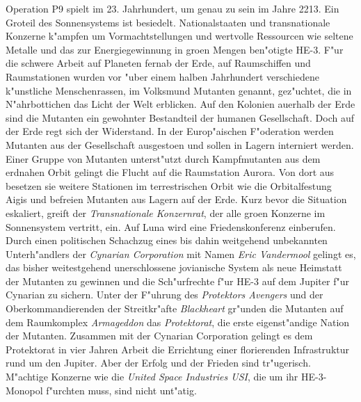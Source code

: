 \newchapter{\@introchaptername}

Operation P9 spielt im 23. Jahrhundert, um genau zu sein im Jahre 2213. Ein Gro\3teil des Sonnensystems ist besiedelt. Nationalstaaten und transnationale Konzerne k"ampfen um Vormachtstellungen und wertvolle Ressourcen wie seltene Metalle und das zur Energiegewinnung in gro\3en Mengen ben"otigte HE-3. F"ur die schwere Arbeit auf Planeten fernab der Erde, auf Raumschiffen und Raumstationen wurden vor "uber einem halben Jahrhundert verschiedene k"unstliche Menschenrassen, im Volksmund Mutanten genannt, gez"uchtet, die in N"ahrbottichen das Licht der Welt erblicken. Auf den Kolonien au\3erhalb der Erde sind die Mutanten ein gewohnter Bestandteil der humanen Gesellschaft. Doch auf der Erde regt sich der Widerstand. In der Europ"aischen F"oderation werden Mutanten aus der Gesellschaft ausgesto\3en und sollen in Lagern interniert werden. Einer Gruppe von Mutanten unterst"utzt durch Kampfmutanten aus dem erdnahen Orbit gelingt die Flucht auf die Raumstation Aurora. Von dort aus besetzen sie weitere Stationen im terrestrischen Orbit wie die Orbitalfestung Aigis und befreien Mutanten aus Lagern auf der Erde. Kurz bevor die Situation eskaliert, greift der \emph{Transnationale Konzernrat}, der alle gro\3en Konzerne im Sonnensystem vertritt, ein. Auf Luna wird eine Friedenskonferenz einberufen. Durch einen politischen Schachzug eines bis dahin weitgehend unbekannten Unterh"andlers der \emph{Cynarian Corporation} mit Namen \emph{Eric Vandermool} gelingt es, das bisher weitestgehend unerschlossene jovianische System als neue Heimstatt der Mutanten zu gewinnen und die Sch"urfrechte f"ur HE-3 auf dem Jupiter f"ur Cynarian zu sichern. Unter der F"uhrung des \emph{Protektors Avengers} und der Oberkommandierenden der Streitkr"afte \emph{Blackheart} gr"unden die Mutanten auf dem Raumkomplex \emph{Armageddon} das \emph{Protektorat}, die erste eigenst"andige Nation der Mutanten. Zusammen mit der Cynarian Corporation gelingt es dem Protektorat in vier Jahren Arbeit die Errichtung einer florierenden Infrastruktur rund um den Jupiter. Aber der Erfolg und der Frieden sind tr"ugerisch. M"achtige Konzerne wie die \emph{United Space Industries USI}, die um ihr HE-3-Monopol f"urchten muss, sind nicht unt"atig.